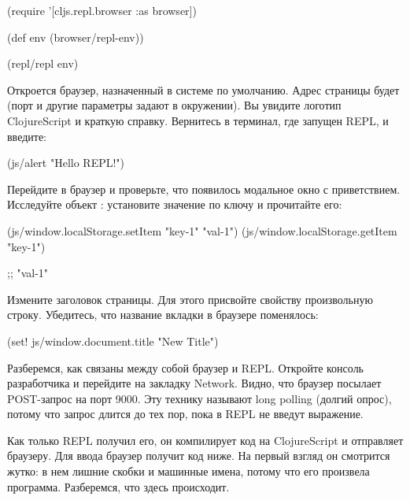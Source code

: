 \begin{english}
  \begin{clojure}
(require '[cljs.repl.browser :as browser])

(def env (browser/repl-env))

(repl/repl env)
  \end{clojure}
\end{english}

Откроется браузер, назначенный в системе по умолчанию. Адрес страницы будет  (порт и другие параметры задают в окружении). Вы увидите логотип ClojureScript и краткую справку. Вернитесь в терминал, где запущен REPL, и введите:

\begin{english}
  \begin{clojure}
(js/alert "Hello REPL!")
  \end{clojure}
\end{english}

Перейдите в браузер и проверьте, что появилось модальное окно с приветствием. Исследуйте объект : установите значение по ключу и прочитайте его:

\begin{english}
  \begin{clojure}
(js/window.localStorage.setItem "key-1" "val-1")
(js/window.localStorage.getItem "key-1")

;; "val-1"
  \end{clojure}
\end{english}

Измените заголовок страницы. Для этого присвойте свойству  произвольную строку. Убедитесь, что название вкладки в браузере поменялось:

\begin{english}
  \begin{clojure}
(set! js/window.document.title "New Title")
  \end{clojure}
\end{english}

Разберемся, как связаны между собой браузер и REPL. Откройте консоль разработчика и перейдите на закладку Network. Видно, что браузер посылает POST-запрос на порт 9000. Эту технику называют long polling (долгий опрос), потому что запрос длится до тех пор, пока в REPL не введут выражение.

Как только REPL получил его, он компилирует код на ClojureScript и отправляет браузеру. Для ввода  браузер получит код ниже. На первый взгляд он смотрится жутко: в нем лишние скобки и машинные имена, потому что его произвела программа. Разберемся, что здесь происходит.

